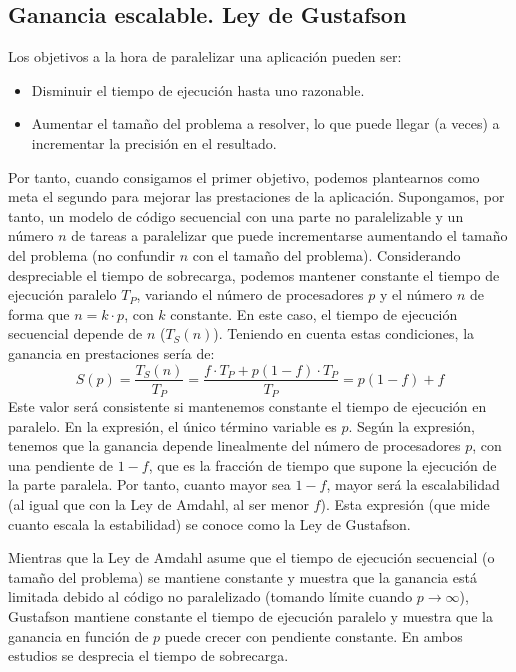 \subsection{Ganancia escalable. Ley de Gustafson}
Los objetivos a la hora de paralelizar una aplicación pueden ser:
\begin{itemize}
    \item Disminuir el tiempo de ejecución hasta uno razonable.
    \item Aumentar el tamaño del problema a resolver, lo que puede llegar (a veces) a incrementar la precisión en el resultado.
\end{itemize}

Por tanto, cuando consigamos el primer objetivo, podemos plantearnos como meta el segundo para mejorar las prestaciones de la aplicación. Supongamos, por tanto, un modelo de código secuencial con una parte no paralelizable y un número $n$ de tareas a paralelizar que puede incrementarse aumentando el tamaño del problema (no confundir $n$ con el tamaño del problema). Considerando despreciable el tiempo de sobrecarga, podemos mantener constante el tiempo de ejecución paralelo $T_P$, variando el número de procesadores $p$ y el número $n$ de forma que $n=k\cdot p$, con $k$ constante. En este caso, el tiempo de ejecución secuencial depende de $n$ ($T_S(n)$). Teniendo en cuenta estas condiciones, la ganancia en prestaciones sería de:
\begin{equation}
    S(p) = \dfrac{T_S(n)}{T_P} = \dfrac{f\cdot T_P + p(1-f)\cdot T_P}{T_P} = p(1-f)+f
\end{equation}
Este valor será consistente si mantenemos constante el tiempo de ejecución en paralelo. En la expresión, el único término variable es $p$. Según la expresión, tenemos que la ganancia depende linealmente del número de procesadores $p$, con una pendiente de $1-f$, que es la fracción de tiempo que supone la ejecución de la parte paralela. Por tanto, cuanto mayor sea $1-f$, mayor será la escalabilidad (al igual que con la Ley de Amdahl, al ser menor $f$). Esta expresión (que mide cuanto escala la estabilidad) se conoce como la Ley de Gustafson.

Mientras que la Ley de Amdahl asume que el tiempo de ejecución secuencial (o tamaño del problema) se mantiene constante y muestra que la ganancia está limitada debido al código no paralelizado (tomando límite cuando $p\to\infty$), Gustafson mantiene constante el tiempo de ejecución paralelo y muestra que la ganancia en función de $p$ puede crecer con pendiente constante. En ambos estudios se desprecia el tiempo de sobrecarga.

